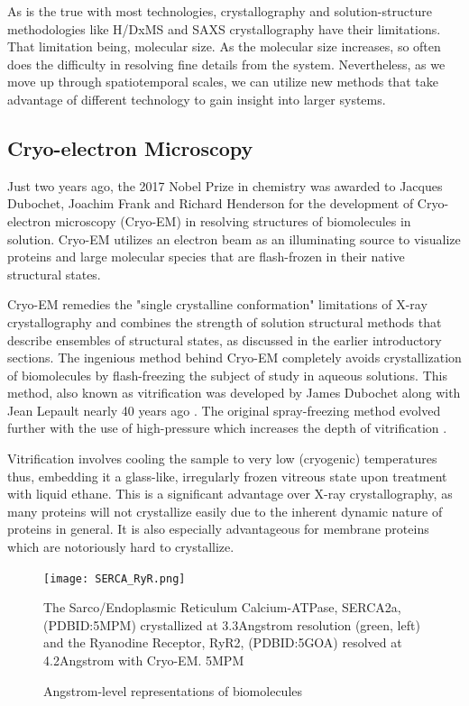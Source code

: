 \documentclass[12pt]{ucsddissertation}
\begin{document}
\begin{dissertationintroduction}
 As is the true with most technologies, crystallography and solution-structure methodologies like H/DxMS and SAXS crystallography have their limitations. That limitation being, molecular size. As the molecular size increases, so often does the difficulty in resolving fine details from the system. Nevertheless, as we move up through spatiotemporal scales, we can utilize new methods that take advantage of different technology to gain insight into larger systems. 
 
\subsection{Cryo-electron Microscopy}

Just two years ago, the 2017 Nobel Prize in chemistry was awarded to Jacques Dubochet, Joachim Frank and Richard Henderson for the development of Cryo-electron microscopy (Cryo-EM) in resolving structures of biomolecules in solution. Cryo-EM utilizes an electron beam as an illuminating source to visualize proteins and large molecular species that are flash-frozen in their native structural states. 

Cryo-EM remedies the "single crystalline conformation" limitations of X-ray crystallography and combines the strength of solution structural methods that describe ensembles of structural states, as discussed in the earlier introductory sections. The ingenious method behind Cryo-EM completely avoids crystallization of biomolecules by flash-freezing the subject of study in aqueous solutions. This method, also known as vitrification was developed by James Dubochet along with Jean Lepault nearly 40 years ago \cite{Dubochet1982,Lepault1983,Lepault1986}. The original spray-freezing method evolved further with the use of high-pressure which increases the depth of vitrification \cite{SARTORI1993}. 

Vitrification involves cooling the sample to very low (cryogenic) temperatures thus, embedding it a glass-like, irregularly frozen vitreous state upon treatment with liquid ethane. This is a significant advantage over X-ray crystallography, as many proteins will not crystallize easily due to the inherent dynamic nature of proteins in general. It is also especially advantageous for membrane proteins which are notoriously hard to crystallize.

\setcounter{figure}{3}
\begin{figure}
\centering
	\texttt{[image: SERCA\_RyR.png]}
	\caption{Angstrom-level representations of biomolecules} The Sarco/Endoplasmic Reticulum Calcium-ATPase, SERCA2a, (PDBID:5MPM) crystallized at 3.3\si{Angstrom} resolution (green, left) and the Ryanodine Receptor, RyR2, (PDBID:5GOA) resolved at 4.2\si{Angstrom} with Cryo-EM. 
5MPM
\end{figure}


\end{dissertationintroduction}
\end{document}
